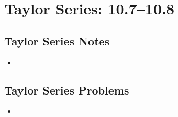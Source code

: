 \chapter{Taylor Series: 10.7--10.8}

\section{Taylor Series Notes}
\begin{itemize}
  \item
\end{itemize}

\section{Taylor Series Problems}
\begin{itemize}
  \item
\end{itemize}

